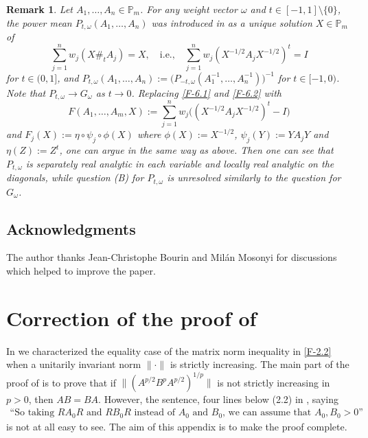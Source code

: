\documentclass[11pt,reqno]{article}
\newtheorem{remark}[theorem]{Remark}
\numberwithin{equation}{section}
\def\bP{\mathbb{P}}
\begin{document}
\begin{remark}\label{R-6.1}\rm
Let $A_1,\dots,A_n\in\bP_m$. For any weight vector $\omega$ and $t\in[-1,1]\setminus\{0\}$, the
\emph{power mean} $P_{t,\omega}(A_1,\dots,A_n)$ was introduced in \cite{LP} as a unique solution
$X\in\bP_m$ of
\[
\sum_{j=1}^nw_j(X\#_tA_j)=X,\quad\mbox{i.e.,}\quad\sum_{j=1}^nw_j(X^{-1/2}A_jX^{-1/2})^t=I
\]
for $t\in(0,1]$, and $P_{t,\omega}(A_1,\dots,A_n):=\bigl(P_{-t,\omega}(A_1^{-1},\dots,A_n^{-1})\bigr)^{-1}$
for $t\in[-1,0)$. Note \cite{LP} that $P_{t,\omega}\to G_\omega$ as $t\to0$. Replacing \eqref{F-6.1} and
\eqref{F-6.2} with
\[
F(A_1,\dots,A_m,X):=\sum_{j=1}^nw_j\bigl((X^{-1/2}A_jX^{-1/2})^t-I\bigr)
\]
and $F_j(X):=\eta\circ\psi_j\circ\phi(X)$ where $\phi(X):=X^{-1/2}$, $\psi_j(Y):=YA_jY$ and $\eta(Z):=Z^t$,
one can argue in the same way as above. Then one can see that $P_{t,\omega}$ is separately real analytic
in each variable and locally real analytic on the diagonals, while question (B) for $P_{t,\omega}$ is unresolved
similarly to the question for $G_\omega$.
\end{remark}

\subsection*{Acknowledgments}

The author thanks Jean-Christophe Bourin and Mil\'an Mosonyi for discussions which helped to improve
the paper.

\appendix

\section{Correction of the proof of \cite[Theorem 2.1]{Hi}}\label{Sec-A}

In \cite[Theorem 2.1]{Hi} we characterized the equality case of the matrix norm inequality in \eqref{F-2.2}
when a unitarily invariant norm $\|\cdot\|$ is strictly increasing. The main part of the proof of
\cite[Theorem 2.1]{Hi} is to prove that if $\big\|(A^{p/2}B^pA^{p/2})^{1/p}\big\|$ is not strictly increasing in
$p>0$, then $AB=BA$. However, the sentence, four lines below (2.2) in \cite{Hi}, saying
\begin{align}\label{F-A.1}
\mbox{``So taking $RA_0R$ and $RB_0R$ instead of $A_0$ and $B_0$, we can assume that $A_0,B_0>0$''}
\end{align}
is not at all easy to see. The aim of this appendix is to make the proof complete.
\end{document}
